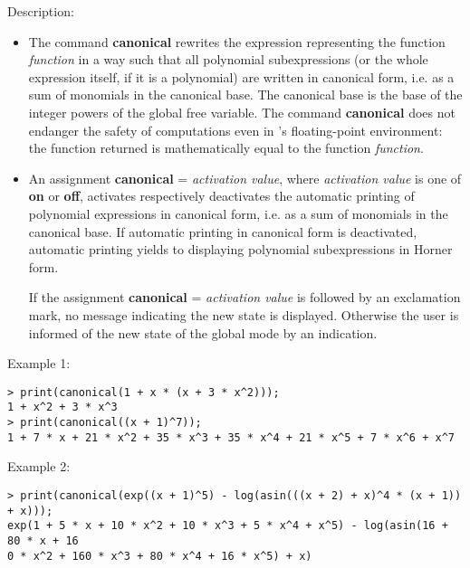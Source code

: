 \noindent Description: \begin{itemize}

\item The command \textbf{canonical} rewrites the expression representing the function
   \emph{function} in a way such that all polynomial subexpressions (or the
   whole expression itself, if it is a polynomial) are written in
   canonical form, i.e. as a sum of monomials in the canonical base. The
   canonical base is the base of the integer powers of the global free
   variable. The command \textbf{canonical} does not endanger the safety of
   computations even in \sollya's floating-point environment: the
   function returned is mathematically equal to the function \emph{function}.

\item An assignment \textbf{canonical} = \emph{activation value}, where \emph{activation value}
   is one of \textbf{on} or \textbf{off}, activates respectively deactivates the
   automatic printing of polynomial expressions in canonical form,
   i.e. as a sum of monomials in the canonical base. If automatic
   printing in canonical form is deactivated, automatic printing yields to
   displaying polynomial subexpressions in Horner form.
    
   If the assignment \textbf{canonical} = \emph{activation value} is followed by an
   exclamation mark, no message indicating the new state is
   displayed. Otherwise the user is informed of the new state of the
   global mode by an indication.
\end{itemize}
\noindent Example 1: 
\begin{center}\begin{minipage}{15cm}\begin{Verbatim}[frame=single,commandchars=\\\|\~]
> print(canonical(1 + x * (x + 3 * x^2)));
1 + x^2 + 3 * x^3
> print(canonical((x + 1)^7));
1 + 7 * x + 21 * x^2 + 35 * x^3 + 35 * x^4 + 21 * x^5 + 7 * x^6 + x^7
\end{Verbatim}
\end{minipage}\end{center}
\noindent Example 2: 
\begin{center}\begin{minipage}{15cm}\begin{Verbatim}[frame=single,commandchars=\\\|\~]
> print(canonical(exp((x + 1)^5) - log(asin(((x + 2) + x)^4 * (x + 1)) + x)));
exp(1 + 5 * x + 10 * x^2 + 10 * x^3 + 5 * x^4 + x^5) - log(asin(16 + 80 * x + 16
0 * x^2 + 160 * x^3 + 80 * x^4 + 16 * x^5) + x)
\end{Verbatim}
\end{minipage}\end{center}
